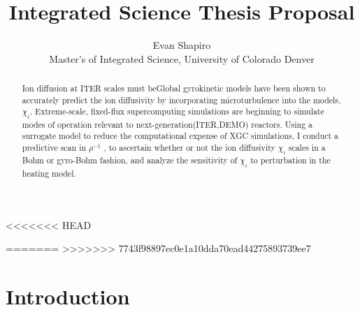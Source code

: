 \documentclass{article}
\title{Integrated Science Thesis Proposal}
\author{Evan Shapiro \\ Master's of Integrated Science, University of Colorado Denver}
\begin{document}
<<<<<<< HEAD


=======
>>>>>>> 7743f98897ec0e1a10dda70ead44275893739ee7

\begin{abstract}
Ion diffusion at ITER scales must beGlobal gyrokinetic models have been shown to accurately predict the ion diffusivity by incorporating microturbulence into the models, $\chi_i$.
Extreme-scale, fixed-flux supercomputing simulations are beginning
to simulate modes of operation relevant to next-generation(ITER,DEMO)
reactors. Using a surrogate model to reduce the computational expense of XGC simulations, I conduct a predictive scan
in $\rho^{-1}$ , to ascertain
whether or not the ion diffusivity $\chi_i$ scales in a Bohm or gyro-Bohm
fashion, and analyze the sensitivity of $\chi_i$ to perturbation in the heating
model.%
\end{abstract}

\maketitle
\tableofcontents

\maketitle
\tableofcontents


\section{Introduction}
\end{document}
